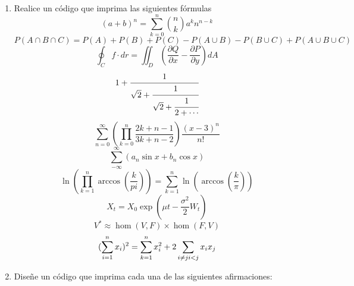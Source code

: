 \documentclass[12pt]{book}
\begin{document}
    \begin{enumerate}
        \item Realice un código que imprima las siguientes fórmulas
            \begin{equation*}
                (a+b)^{n} = \sum_{k = 0}^{n}\binom{n}{k}a^{k}n^{n-k}
            \end{equation*}
            \begin{equation*}
                P(A \cap B \cap C ) = P(A)+P(B)+P(C)-P(A \cup B)-P(B \cup C )+P(A\cup B\cup C)
            \end{equation*}
            \begin{equation*}
                \oint_C f \cdot dr = \iint_{D}(\frac{\partial Q}{\partial x}-\frac{\partial P}{\partial y})dA
            \end{equation*}
            \begin{equation*}
                1+\cfrac{1}{\sqrt{2}+\cfrac{1}{\sqrt{2}+\cfrac{1}{2 + \cdots}}}
            \end{equation*}
            \begin{equation*}
                \sum_{n = 0}^{\infty}(\prod_{k = 0}^{n}\frac{2k+n-1}{3k+n-2})\frac{(x-3)^{n}}{n!}
            \end{equation*}
            \begin{equation*}
                \sum_{-\infty}^{\infty}(a_{n}\sin x +b_{n} \cos x)
            \end{equation*}
            \begin{equation*}
                \ln(\prod_{k=1}^{n}\arccos (\frac{k}{pi})) = \sum_{k=1}^{n}\ln(\arccos(\frac{k}{\pi}))
            \end{equation*}
            \begin{equation*}
                X_{t} = X_{0} \exp(\mu t - \frac{\sigma^{2}}{2}W_{t})
            \end{equation*}
            \begin{equation*}
                V^{*} \approx \hom(V,F) \times \hom(F,V)
            \end{equation*}
            \begin{equation*}
                (\sum_{i=1}^{n}x_{i})^{2} = \sum_{k=1}^{n}x_{i}^{2}+2\sum_{i \not = j \\ i < j} x_{i}x_{j}
            \end{equation*}
        \item Diseñe un código que imprima cada una de las siguientes afirmaciones:
            \begin{itemize}

\end{itemize}
\end{enumerate}
\end{document}

